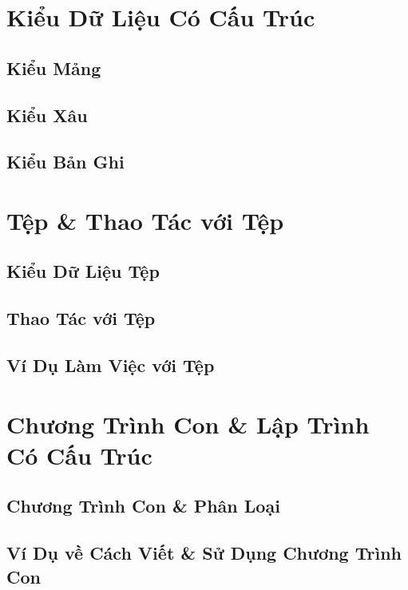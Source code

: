 \documentclass[oneside]{book}
\numberwithin{equation}{section}
\begin{document}
\chapter{Kiểu Dữ Liệu Có Cấu Trúc}

\section{Kiểu Mảng}

\section{Kiểu Xâu}

\section{Kiểu Bản Ghi}


\chapter{Tệp \& Thao Tác với Tệp}

\section{Kiểu Dữ Liệu Tệp}

\section{Thao Tác với Tệp}

\section{Ví Dụ Làm Việc với Tệp}


\chapter{Chương Trình Con \& Lập Trình Có Cấu Trúc}

\section{Chương Trình Con \& Phân Loại}

\section{Ví Dụ về Cách Viết \& Sử Dụng Chương Trình Con}
\end{document}
